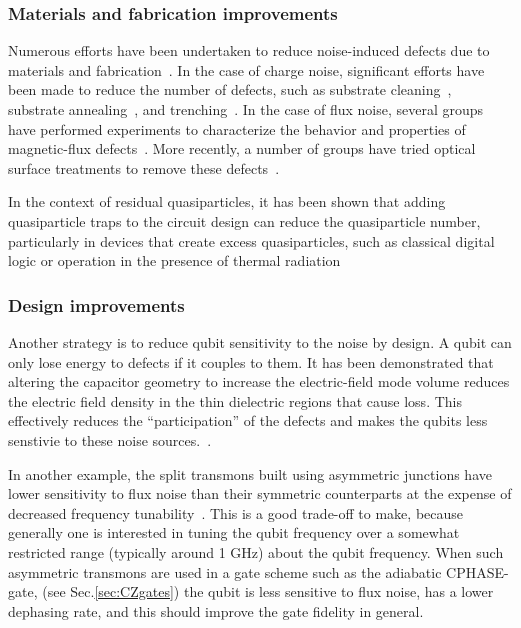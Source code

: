 \documentclass[aip,apr,twocolumn,showpacs,superscriptaddress,groupedaddress,nofootinbib,reprint]{revtex4-1}  %
\begin{document}
\subsubsection{Materials and fabrication improvements}
Numerous efforts have been undertaken to reduce noise-induced defects due to materials and fabrication~\cite{Oliver2013,Sage2011}. In the case of charge noise, significant efforts have been made %
to reduce the number of defects, such as substrate cleaning~\cite{Quintana2014,Zeng2015a}, substrate annealing~\cite{Kamal2016}, and trenching~\cite{Gambetta2017,Calusine2018}.
%
In the case of flux noise, several groups have performed experiments to characterize the behavior and properties of magnetic-flux defects~\cite{KochRoger2007,Anton2013,Sendelbach2008}. More recently, a number of groups have tried optical surface treatments to remove these defects~\cite{Kumar2016}.

In the context of residual quasiparticles, it has been shown that adding quasiparticle traps to the circuit design can reduce the quasiparticle number, particularly in devices that create excess quasiparticles, such as classical digital logic or operation in the presence of thermal radiation~\cite{Riwar2016}

\subsubsection{Design improvements}

Another strategy is to reduce qubit sensitivity to the noise by design. A qubit can only lose energy to defects if it couples to them. It has been demonstrated that altering the capacitor geometry to increase the electric-field mode volume reduces the electric field density in the thin dielectric regions that cause loss. This effectively reduces the ``participation'' of the defects and makes the qubits less senstivie to these noise sources.~\cite{Paik2011,Wang2015,Yan2016}.

In another example, the split transmons built using asymmetric junctions have lower sensitivity to flux noise than their symmetric counterparts at the expense of decreased frequency tunability~\cite{Hutchings2017}. This is a good trade-off to make, because generally one is interested in tuning the qubit frequency over a somewhat restricted range (typically around 1 GHz) about the qubit frequency. When such asymmetric transmons are used in a gate scheme such as the adiabatic \textsf{CPHASE}-gate\cite{Barends2014}, (see Sec.\ref{sec:CZgates}) the qubit is less sensitive to flux noise, has a lower dephasing rate, and this should improve the gate fidelity in general.
\end{document}
